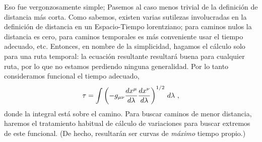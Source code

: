 \documentclass[11pt,b5paper,openany,twoside]{book}
\newcommand{\mn}{{\mu\nu}}
\begin{document}
Eso fue vergonzosamente simple; Pasemos al caso menos trivial de la definición de distancia más corta.
Como sabemos, existen varias sutilezas involucradas en la definición de distancia en un Espacio-Tiempo lorentziano; para caminos nulos la distancia es cero, para caminos temporales es más conveniente usar el tiempo adecuado, etc.
Entonces, en nombre de la simplicidad, hagamos el cálculo solo para una ruta temporal: la ecuación resultante resultará buena para cualquier ruta, por lo que no estamos perdiendo ninguna generalidad.
Por lo tanto consideramos funcional el tiempo adecuado,
\begin{equation}
\tau = \int \left(-g_\mn {{dx^\mu}\over{d\lambda}}
{{dx^\nu}\over{d\lambda}}\right)^{1/2}\, d\lambda\ ,\label{3.48}
\end{equation}
donde la integral está sobre el camino.
Para buscar caminos de menor distancia, haremos el tratamiento habitual de cálculo de variaciones para buscar extremos de este funcional.
(De hecho, resultarán ser curvas de {\it máximo} tiempo propio.)
\end{document}
